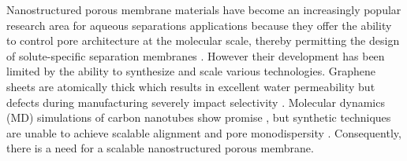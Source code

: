 \documentclass[journal=jpcbfk,manuscript=article]{achemso}
\begin{document}

  Nanostructured porous membrane materials have become an increasingly popular
  research area for aqueous separations applications because they offer the 
  ability to control pore architecture at the molecular scale, thereby 
  permitting the design of solute-specific separation membranes 
  \cite{humplik_nanostructured_2011}. However their development has been 
  limited by the ability to synthesize and scale various technologies. Graphene
  sheets are atomically thick which results in excellent water permeability but
  defects during manufacturing severely impact selectivity \cite{cohen-tanugi_multilayer_2016}.
  Molecular dynamics (MD) simulations of carbon nanotubes show promise
  \cite{humplik_nanostructured_2011}, but synthetic techniques are unable to
  achieve scalable alignment and pore monodispersity
  \cite{hata_water-assisted_2004,maruyama_growth_2005}. Consequently, there is a
  need for a scalable nanostructured porous membrane. 


  
\end{document}
